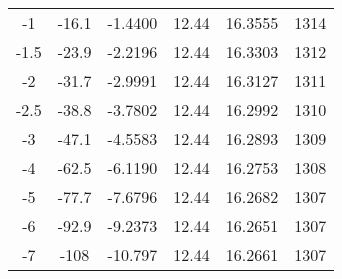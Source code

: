 \begin{table}[!ht]
\begin{tabular}{cccccc}
		-1        & -16.1   & -1.4400  & 12.44              & 16.3555      & 1314        \\
		-1.5      & -23.9   & -2.2196  & 12.44              & 16.3303      & 1312        \\
		-2        & -31.7   & -2.9991  & 12.44              & 16.3127      & 1311        \\
		-2.5      & -38.8   & -3.7802  & 12.44              & 16.2992      & 1310        \\
		-3        & -47.1   & -4.5583  & 12.44              & 16.2893      & 1309        \\
		-4        & -62.5   & -6.1190  & 12.44              & 16.2753      & 1308        \\
		-5        & -77.7   & -7.6796  & 12.44              & 16.2682      & 1307        \\
		-6        & -92.9   & -9.2373  & 12.44              & 16.2651      & 1307        \\
		-7        & -108    & -10.797  & 12.44              & 16.2661      & 1307        \\ \hline
	\end{tabular}
\end{table}
